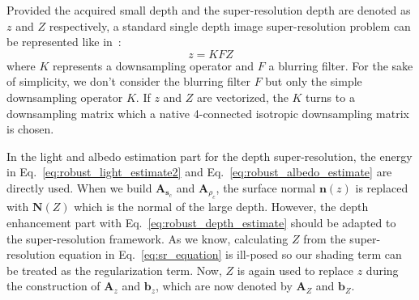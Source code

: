 Provided the acquired small depth and the super-resolution depth are denoted as $z$ and $Z$ respectively,
a standard single depth image super-resolution problem can be represented like in~\cite{yang2010image}:
\begin{equation}\label{eq:sr_equation}
z = KFZ
\end{equation}
where $K$ represents a downsampling operator and $F$ a blurring filter.
For the sake of simplicity, we don't consider the blurring filter $F$ but only the simple downsampling operator $K$.
If $z$ and $Z$ are vectorized, the $K$ turns to a downsampling matrix which a native 4-connected isotropic downsampling matrix is chosen.

In the light and albedo estimation part for the depth super-resolution, the energy in Eq.~\ref{eq:robust_light_estimate2} and Eq.~\ref{eq:robust_albedo_estimate} are directly used. When we build $\mathbf{A}_{\mathbf{s}_c}$ and $\mathbf{A}_{\rho_c}$, the surface normal $\mathbf{n}(z)$ is replaced with $\mathbf{N}(Z)$ which is the normal of the large depth. 
However, the depth enhancement part with Eq.~\ref{eq:robust_depth_estimate} should be adapted to the super-resolution framework. 
As we know, calculating $Z$ from the super-resolution equation in Eq.~\ref{eq:sr_equation} is ill-posed so our shading term can be treated as the regularization term.
Now, $Z$ is again used to replace $z$ during the construction of $\mathbf{A}_z$ and $\mathbf{b}_z$, which are now denoted by $\mathbf{A}_Z$ and $\mathbf{b}_Z$.
 
